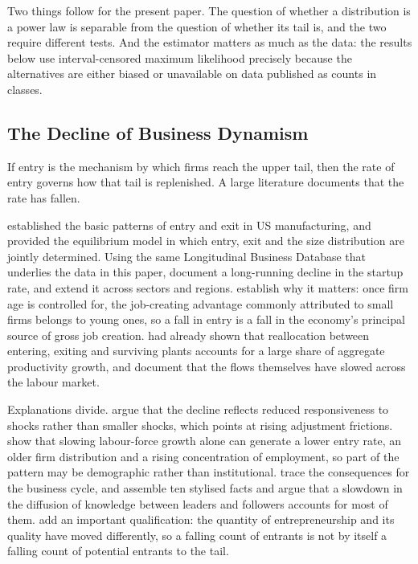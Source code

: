 \documentclass[jrfm,article,submit,pdftex,moreauthors]{Definitions/mdpi}
\begin{document}
Two things follow for the present paper. The question of whether a distribution is a power
law is separable from the question of whether its tail is, and the two require different
tests. And the estimator matters as much as the data: the results below use interval-censored
maximum likelihood precisely because the alternatives are either biased or unavailable on
data published as counts in classes.

\subsection{The Decline of Business Dynamism}
\label{subsec:lit_dynamism}

If entry is the mechanism by which firms reach the upper tail, then the rate of entry
governs how that tail is replenished. A large literature documents that the rate has fallen.

\citet{DunneRobertsSamuelson1988} established the basic patterns of entry and exit in US
manufacturing, and \citet{Hopenhayn1992} provided the equilibrium model in which entry, exit
and the size distribution are jointly determined. Using the same Longitudinal Business
Database that underlies the data in this paper, \citet{DeckerEtAl2014} document a
long-running decline in the startup rate, and \citet{DeckerEtAl2016} extend it across
sectors and regions. \citet{HaltiwangerJarminMiranda2013} establish why it matters: once firm age is
controlled for, the job-creating advantage commonly attributed to small firms belongs to
young ones, so a fall in entry is a fall in the economy's principal source of gross job
creation. \citet{FosterHaltiwangerKrizan2001} had already shown that reallocation
between entering, exiting and surviving plants accounts for a large share of aggregate
productivity growth, and \citet{DavisHaltiwanger2014} document that the flows themselves
have slowed across the labour market.

Explanations divide. \citet{DeckerEtAl2020} argue that the decline reflects reduced
responsiveness to shocks rather than smaller shocks, which points at rising adjustment
frictions. \citet{HopenhaynNeiraSinghania2022} show that slowing labour-force growth alone
can generate a lower entry rate, an older firm distribution and a rising concentration of
employment, so part of the pattern may be demographic rather than institutional.
\citet{PugsleySahin2019} trace the consequences for the business cycle, and
\citet{AkcigitAtes2021} assemble ten stylised facts and argue that a slowdown in the
diffusion of knowledge between leaders and followers accounts for most of them.
\citet{GuzmanStern2020} add an important qualification: the quantity of entrepreneurship
and its quality have moved differently, so a falling count of entrants is not by itself a
falling count of potential entrants to the tail.
\end{document}
